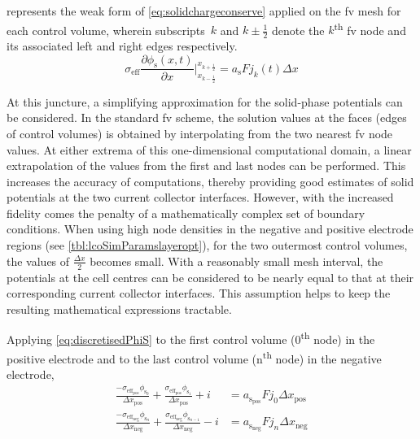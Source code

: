          represents     the      weak     form      of
    \cref{eq:solidchargeconserve}  applied   on  the  \gls{fv}  mesh   for  each
    control  volume, wherein  subscripts~$k$  and  $k\pm\frac{1}{2}$ denote  the
    $k$\textsuperscript{th}  \gls{fv} node  and  its associated  left and  right
    edges respectively.
    \begin{equation} \label{eq:discretisedPhiS}
        \sigma_{\text{eff}} \frac{\partial \phi_\text{s}(x,t)}{\partial x}\Bigg|_{x_{k-\frac{1}{2}}}^{x_{k+\frac{1}{2}}} = a_\text{s} F j_k(t) \Delta x
    \end{equation}

    At this juncture, a simplifying approximation for the solid-phase potentials
    can be considered.  In the standard \gls{fv} scheme, the  solution values at
    the faces (edges  of control volumes) is obtained by  interpolating from the
    two nearest \gls{fv} node values.  At either extrema of this one-dimensional
    computational  domain,  a  linear  extrapolation  of  the  values  from  the
    first  and last  nodes  can be  performed. This  increases  the accuracy  of
    computations, thereby  providing good estimates  of solid potentials  at the
    two current collector interfaces. However, with the increased fidelity comes
    the  penalty  of  a  mathematically  complex  set  of  boundary  conditions.
    When  using high  node  densities  in the  negative  and positive  electrode
    regions (see \cref{tbl:lcoSimParamslayeropt}), for the two outermost control
    volumes, the values of $\frac{\Delta x}{2}$ becomes small. With a reasonably
    small mesh interval, the potentials at the cell centres can be considered to
    be nearly equal to that at their corresponding current collector interfaces.
    This  assumption  helps  to  keep  the  resulting  mathematical  expressions
    tractable.

    Applying    \cref{eq:discretisedPhiS}    to    the    first    control    volume
    (0\textsuperscript{th} node) in  the positive electrode and to  the last control
    volume (n\textsuperscript{th} node) in the negative electrode,
    \begin{align}
	    \frac{-\sigma_{\text{eff}_\text{pos}} \phi_{\text{s}_0}}{\Delta x_\text{pos}} + \frac{\sigma_{\text{eff}_\text{pos}} \phi_{\text{s}_1}}{\Delta x_\text{pos}} + i &= a_{\text{s}_\text{pos}} F j_0 \Delta x_\text{pos}\label{eq:PhiSappliedBCpos}\\
	    \frac{-\sigma_{\text{eff}_\text{neg}} \phi_{\text{s}_n}}{\Delta x_\text{neg}} + \frac{\sigma_{\text{eff}_\text{neg}} \phi_{\text{s}_{n-1}}}{\Delta x_\text{neg}} - i &= a_{\text{s}_\text{neg}} F j_n \Delta x_\text{neg}\label{eq:PhiSappliedBCneg}
    \end{align}

